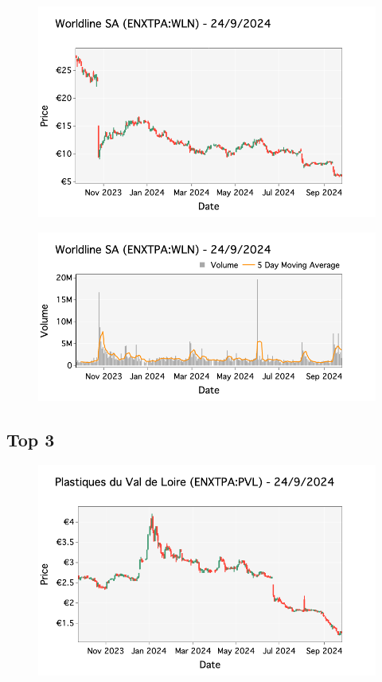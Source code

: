 \documentclass[a4paper, twocolumn, 11pt, paperequity]{gorgona}
\begin{document}
\begin{figure}[H]
    \centering
    \includegraphics[width=\columnwidth]{France/images/Top_Returns/Top_2_candlestick.png}
\end{figure}

\begin{figure}[H]
    \centering
    \includegraphics[width=\columnwidth]{France/images/Top_Returns/Top_2_volume.png}
\end{figure}

\subsection*{Top 3}

\begin{figure}[H]
    \centering
    \includegraphics[width=\columnwidth]{France/images/Top_Returns/Top_3_candlestick.png}
\end{figure}
\end{document}

